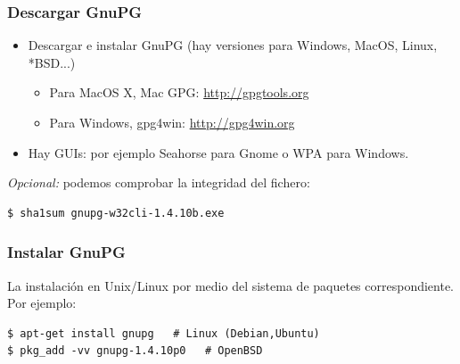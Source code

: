 \documentclass{beamer}
\begin{document}
\begin{frame}[fragile]
\frametitle{Descargar GnuPG}

\begin{itemize}
\item Descargar e instalar GnuPG (hay versiones para Windows, MacOS, Linux, *BSD...)
	\begin{itemize}
	\item Para MacOS X, \alert{Mac GPG}: \url{http://gpgtools.org} 
	\item Para Windows, \alert{gpg4win}: \url{http://gpg4win.org}
	\end{itemize}
\item Hay GUIs: por ejemplo \alert{Seahorse} para Gnome o WPA para Windows.
\end{itemize}

\center \textit{Opcional:} podemos comprobar la integridad del fichero:



\begin{lstlisting}[frame=trBL]
$ sha1sum gnupg-w32cli-1.4.10b.exe
\end{lstlisting}

\end{frame}


\begin{frame}[fragile]
\frametitle{Instalar GnuPG}

La instalación en Unix/Linux por medio del sistema de paquetes correspondiente. Por ejemplo:



\begin{lstlisting}[frame=trBL]
$ apt-get install gnupg   # Linux (Debian,Ubuntu)
$ pkg_add -vv gnupg-1.4.10p0   # OpenBSD
\end{lstlisting}

\end{frame}
\end{document}
